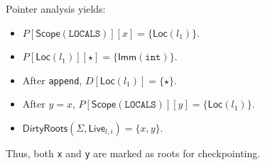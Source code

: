 Pointer analysis yields:
\begin{itemize}
    \item \(P[\mathsf{Scope}(\mathtt{LOCALS})][x] = \{\mathsf{Loc}(l_1)\}\).
    \item \(P[\mathsf{Loc}(l_1)][\star] = \{\mathsf{Imm}(\mathtt{int})\}\).
    \item After \texttt{append}, \(D[\mathsf{Loc}(l_1)] = \{\star\}\).
    \item After \(y = x\), \(P[\mathsf{Scope}(\mathtt{LOCALS})][y] = \{\mathsf{Loc}(l_1)\}\).
    \item \(\mathsf{DirtyRoots}(\Sigma,\mathsf{Live}_{l,i}) = \{x,y\}\).
\end{itemize}
Thus, both \texttt{x} and \texttt{y} are marked as roots for checkpointing.
